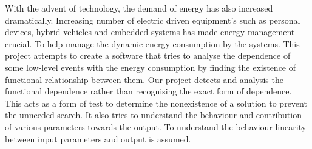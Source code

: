 With the advent of technology, the demand of energy has also increased dramatically. Increasing number of electric driven equipment’s such as personal devices, hybrid vehicles and embedded systems has made energy management crucial. To help manage the dynamic energy consumption by the systems. This project attempts to create a software that tries to analyse the dependence of some low-level events with the energy consumption by finding the existence of functional relationship between them. Our project detects and analysis the functional dependence rather than recognising the exact form of dependence. This acts as a form of test to determine the nonexistence of a solution to prevent the unneeded search. It also tries to understand the behaviour and contribution of various parameters towards the output. To understand the behaviour linearity between input parameters and output is assumed.